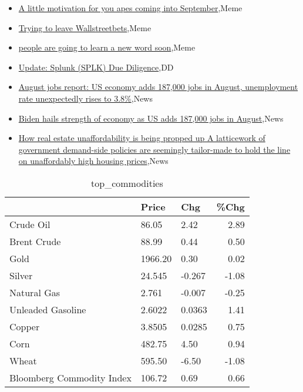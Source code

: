 \documentclass{article}%
\begin{document}
%
\begin{itemize}%
\item%
\href{https://reddit.com/r/wallstreetbets/comments/167tv2y/a\_little\_motivation\_for\_you\_apes\_coming\_into/}{A little motivation for you apes coming into September},Meme%
\item%
\href{https://reddit.com/r/wallstreetbets/comments/167plm4/trying\_to\_leave\_wallstreetbets/}{Trying to leave Wallstreetbets},Meme%
\item%
\href{https://reddit.com/r/wallstreetbets/comments/167od7a/people\_are\_going\_to\_learn\_a\_new\_word\_soon/}{people are going to learn a new word soon},Meme%
\item%
\href{https://reddit.com/r/wallstreetbets/comments/167mwcg/update\_splunk\_splk\_due\_diligence/}{Update: Splunk (SPLK) Due Diligence},DD%
\item%
\href{https://reddit.com/r/StockMarket/comments/1675xzl/august\_jobs\_report\_us\_economy\_adds\_187000\_jobs\_in/}{August jobs report: US economy adds 187,000 jobs in August, unemployment rate unexpectedly rises to 3.8\%},News%
\item%
\href{https://reddit.com/r/Economics/comments/167qqnr/biden\_hails\_strength\_of\_economy\_as\_us\_adds\_187000/}{Biden hails strength of economy as US adds 187,000 jobs in August},News%
\item%
\href{https://reddit.com/r/Economics/comments/167iars/how\_real\_estate\_unaffordability\_is\_being\_propped/}{How real estate unaffordability is being propped up  A latticework of government demand-side policies are seemingly tailor-made to hold the line on unaffordably high housing prices},News%
\end{itemize}%


\begin{table}[htbp]%
\caption{top\_commodities}%
\centering%
\begin{adjustbox}{width=1\textwidth}%
\begin{tabular}{lllr}
\toprule
                          &   Price &    Chg &  \%Chg \\
\midrule
               Crude Oil  &   86.05 &   2.42 &  2.89 \\
             Brent Crude  &   88.99 &   0.44 &  0.50 \\
                    Gold  & 1966.20 &   0.30 &  0.02 \\
                  Silver  &  24.545 & -0.267 & -1.08 \\
             Natural Gas  &   2.761 & -0.007 & -0.25 \\
       Unleaded Gasoline  &  2.6022 & 0.0363 &  1.41 \\
                  Copper  &  3.8505 & 0.0285 &  0.75 \\
                    Corn  &  482.75 &   4.50 &  0.94 \\
                   Wheat  &  595.50 &  -6.50 & -1.08 \\
Bloomberg Commodity Index &  106.72 &   0.69 &  0.66 \\
\bottomrule
\end{tabular}
%
\end{adjustbox}%
\end{table}
\end{document}
